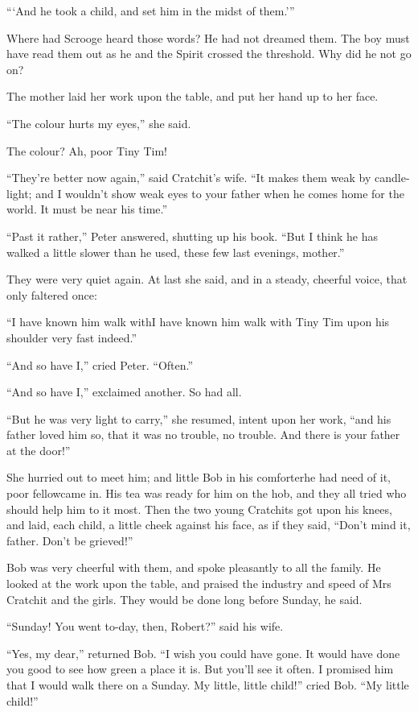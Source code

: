 \documentclass[paper=5.5in:8.5in,BCOR=7mm,twoside,DIV=calc,12pt,usegeometry]{scrbook} %
\begin{document}
\enquote{\enquote{And he took a child, and set him in the midst of them.}}

Where had Scrooge heard those words? He had not dreamed them. The boy must have read them out as he and the Spirit crossed the threshold. Why did he not go on?

The mother laid her work upon the table, and put her hand up to her face.

\enquote{The colour hurts my eyes,} she said.

The colour? Ah, poor Tiny Tim!

\enquote{They're better now again,} said Cratchit's wife. \enquote{It makes them weak by candle-light; and I wouldn't show weak eyes to your father when he comes home for the world. It must be near his time.}

\enquote{Past it rather,} Peter answered, shutting up his book. \enquote{But I think he has walked a little slower than he used, these few last evenings, mother.}

They were very quiet again. At last she said, and in a steady, cheerful voice, that only faltered once:

\enquote{I have known him walk with\textemdash I have known him walk with Tiny Tim upon his shoulder very fast indeed.}

\enquote{And so have I,} cried Peter. \enquote{Often.}

\enquote{And so have I,} exclaimed another. So had all.

\enquote{But he was very light to carry,} she resumed, intent upon her work, \enquote{and his father loved him so, that it was no trouble, no trouble. And there is your father at the door!}

She hurried out to meet him; and little Bob in his comforter\textemdash he had need of it, poor fellow\textemdash came in. His tea was ready for him on the hob, and they all tried who should help him to it most. Then the two young Cratchits got upon his knees, and laid, each child, a little cheek against his face, as if they said, \enquote{Don't mind it, father. Don't be grieved!}

Bob was very cheerful with them, and spoke pleasantly to all the family. He looked at the work upon the table, and praised the industry and speed of Mrs Cratchit and the girls. They would be done long before Sunday, he said.

\enquote{Sunday! You went to-day, then, Robert?} said his wife.

\enquote{Yes, my dear,} returned Bob. \enquote{I wish you could have gone. It would have done you good to see how green a place it is. But you'll see it often. I promised him that I would walk there on a Sunday. My little, little child!} cried Bob. \enquote{My little child!}
\end{document}
